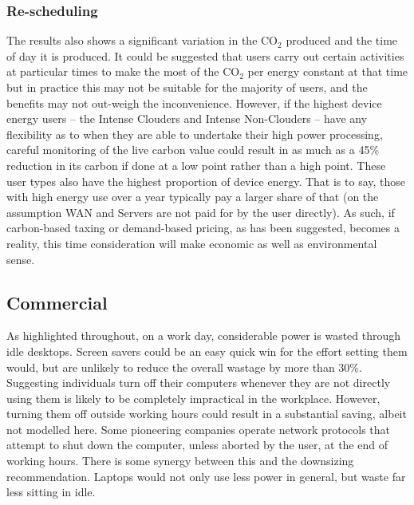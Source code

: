 \documentclass[conference]{IEEEtran}
\begin{document}
\subsubsection{Re-scheduling}

The results also shows a significant variation in the CO$_2$ produced
and the time of day it is produced. It could be suggested that users
carry out certain activities at particular times to make the most of
the CO$_2$ per energy constant at that time but in practice this may
not be suitable for the majority of users, and the benefits may not
out-weigh the inconvenience. However, if the highest device energy
users -- the Intense Clouders and Intense Non-Clouders -- have any
flexibility as to when they are able to undertake their high power
processing, careful monitoring of the live carbon value could result
in as much as a 45\% reduction in its carbon if done at a low point
rather than a high point. These user types also have the highest
proportion of device energy. That is to say, those with high energy
use over a year typically pay a larger share of that (on the
assumption WAN and Servers are not paid for by the user directly). As
such, if carbon-based taxing or demand-based pricing, as has been
suggested, becomes a reality, this time consideration will make
economic as well as environmental sense.

\subsection{Commercial}


As highlighted throughout, on a work day, considerable power is wasted
through idle desktops. Screen savers could be an easy quick win for
the effort setting them would, but are unlikely to reduce the overall
wastage by more than 30\%. Suggesting individuals turn off their
computers whenever they are not directly using them is likely to be
completely impractical in the workplace. However, turning them off
outside working hours could result in a substantial saving, albeit not
modelled here. Some pioneering companies operate network protocols
that attempt to shut down the computer, unless aborted by the user, at
the end of working hours. There is some synergy between this and the
downsizing recommendation. Laptops would not only use less power in
general, but waste far less sitting in idle.
\end{document}
